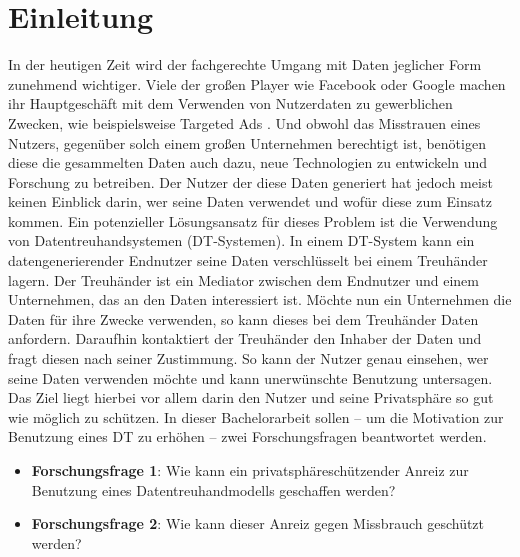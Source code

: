 \documentclass[
	fontsize=11pt,
	headings=small,
	parskip=half,           %
	bibliography=totoc,
	numbers=noenddot,       %
	open=any,               %
]{scrreprt}
\begin{document}
\chapter{Einleitung}
\label{chap:intro}
In der heutigen Zeit wird der fachgerechte Umgang mit Daten jeglicher Form zunehmend wichtiger. Viele der großen Player wie Facebook oder Google machen ihr Hauptgeschäft mit dem Verwenden von Nutzerdaten zu gewerblichen Zwecken, wie beispielsweise Targeted Ads \cite{facebookad,googlead}. Und obwohl das Misstrauen eines Nutzers, gegenüber solch einem großen Unternehmen berechtigt ist, benötigen diese die gesammelten Daten auch dazu, neue Technologien zu entwickeln und Forschung zu betreiben. Der Nutzer der diese Daten generiert hat jedoch meist keinen Einblick darin, wer seine Daten verwendet und wofür diese zum Einsatz kommen. Ein potenzieller Lösungsansatz für dieses Problem ist die Verwendung von Datentreuhandsystemen (DT-Systemen). In einem DT-System kann ein datengenerierender Endnutzer seine Daten verschlüsselt bei einem Treuhänder lagern. Der Treuhänder ist ein Mediator zwischen dem Endnutzer und einem Unternehmen, das an den Daten interessiert ist. Möchte nun ein Unternehmen die Daten für ihre Zwecke verwenden, so kann dieses bei dem Treuhänder Daten anfordern. Daraufhin kontaktiert der Treuhänder den Inhaber der Daten und fragt diesen nach seiner Zustimmung. So kann der Nutzer genau einsehen, wer seine Daten verwenden möchte und kann unerwünschte Benutzung untersagen. Das Ziel liegt hierbei vor allem darin den Nutzer und seine Privatsphäre so gut wie möglich zu schützen. In dieser Bachelorarbeit sollen -- um die Motivation zur Benutzung eines DT zu erhöhen -- zwei Forschungsfragen beantwortet werden. 

\begin{itemize}
    \item \textbf{Forschungsfrage 1}: Wie kann ein privatsphäreschützender Anreiz zur Benutzung eines Datentreuhandmodells geschaffen werden? 
    \item \textbf{Forschungsfrage 2}: Wie kann dieser Anreiz gegen Missbrauch geschützt werden? 
\end{itemize}
\end{document}
